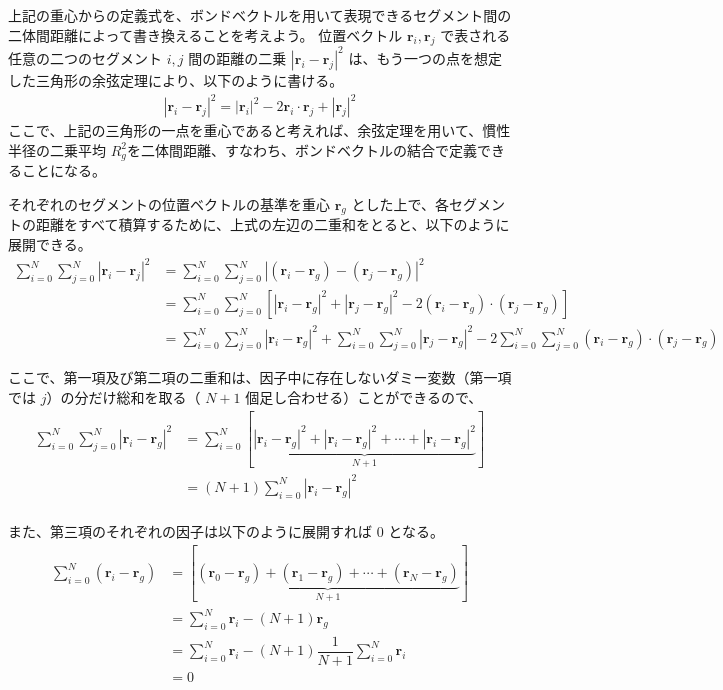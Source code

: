 \documentclass[uplatex,dvipdfmx,a4paper,11pt, titlepage]{jsarticle}
\begin{document}
\begin{appendix}
上記の重心からの定義式を、ボンドベクトルを用いて表現できるセグメント間の二体間距離によって書き換えることを考えよう。
位置ベクトル $\bm{r}_{i}, \bm{r}_{j}$ で表される任意の二つのセグメント $i, j$ 間の距離の二乗 $|\bm{r}_{i} - \bm{r}_{j}|^2$ は、もう一つの点を想定した三角形の余弦定理により、以下のように書ける。 
\begin{align*}
|\bm{r}_{i} - \bm{r}_{j}|^2 = |\bm{r}_{i}|^2 - 2 \bm{r}_{i}\cdot\bm{r}_{j} + |\bm{r}_{j}|^2
\end{align*}
ここで、上記の三角形の一点を重心であると考えれば、余弦定理を用いて、慣性半径の二乗平均 $R_g^2$を二体間距離、すなわち、ボンドベクトルの結合で定義できることになる。

それぞれのセグメントの位置ベクトルの基準を重心 $\bm{r}_g$ とした上で、各セグメントの距離をすべて積算するために、上式の左辺の二重和をとると、以下のように展開できる。
\begin{align*}
\sum_{i = 0}^N \sum_{j=0}^N \left| \bm{r}_i - \bm{r}_j \right|^2
	&= \sum_{i = 0}^N \sum_{j=0}^N  \left| (\bm{r}_i - \bm{r}_g) - (\bm{r}_j - \bm{r}_g) \right|^2 \\
	&= \sum_{i = 0}^N \sum_{j=0}^N \left[ \left| \bm{r}_i - \bm{r}_g \right|^2 + \left|\bm{r}_j - \bm{r}_g \right|^2 
		-2 (\bm{r}_i - \bm{r}_g) \cdot (\bm{r}_j - \bm{r}_g) \right] \\
	&= \sum_{i = 0}^N \sum_{j=0}^N \left| \bm{r}_i - \bm{r}_g \right|^2 + \sum_{i = 0}^N \sum_{j=0}^N \left|\bm{r}_j - \bm{r}_g \right|^2 
		-2 \sum_{i = 0}^N \sum_{j=0}^N (\bm{r}_i - \bm{r}_g) \cdot (\bm{r}_j - \bm{r}_g)
\end{align*}

ここで、第一項及び第二項の二重和は、因子中に存在しないダミー変数（第一項では $j$）の分だけ総和を取る（ $N+1$ 個足し合わせる）ことができるので、
\begin{align*}
\sum_{i = 0}^N \sum_{j=0}^N \left| \bm{r}_i - \bm{r}_g \right|^2 
	&= \sum_{i = 0}^N \left[ \underbrace{ \left| \bm{r}_i - \bm{r}_g \right|^2 + \left| \bm{r}_i - \bm{r}_g \right|^2 + \cdots + \left|\bm{r}_i - \bm{r}_g \right|^2 }_{N+1} \right]\\
	&= (N+1) \sum_{i = 0}^N \left| \bm{r}_i - \bm{r}_g \right|^2 \\
\end{align*}

また、第三項のそれぞれの因子は以下のように展開すれば 0 となる。
\begin{align*}
\sum_{i=0}^N (\bm{r}_i - \bm{r}_g) 
	&= \left[ \underbrace{ (\bm{r}_0 - \bm{r}_g) + (\bm{r}_1 - \bm{r}_g) + \cdots + (\bm{r}_N - \bm{r}_g) }_{N+1}\right] \\
	&= \sum_{i=0}^N \bm{r}_i -(N+1) \bm{r}_g \\
	&= \sum_{i=0}^N \bm{r}_i -(N+1) \dfrac{1}{N+1} \sum_{i=0}^{N} \bm{r}_i \\
	&=0
\end{align*}


\end{appendix}
\end{document}
